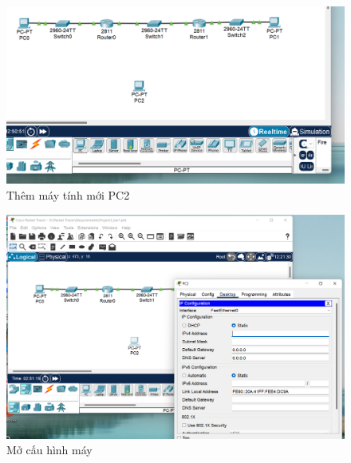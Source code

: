 \begin{enumerate}
\begin{figure}[H]
\begin{center}
\includegraphics[scale=0.5]{../figures/p1/p1-5b}
\end{center}
\caption{Thêm máy tính mới PC2}
\end{figure}

\begin{figure}[H]
\begin{center}
\includegraphics[scale=0.5]{../figures/p1/p1-5c}
\end{center}
\caption{Mở cấu hình máy}
\end{figure}


\end{enumerate}
